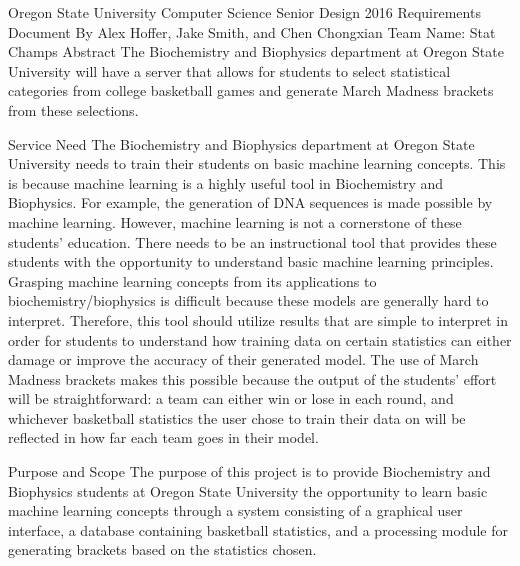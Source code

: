 \documentclass[letterpaper, 10pt,titlepage]{article}
\begin{document}
\begin{center}

Oregon State University Computer Science Senior Design 2016
\bigbreak
Requirements Document
\bigbreak
By Alex Hoffer, Jake Smith, and Chen Chongxian
\bigbreak
Team Name: Stat Champs
\bigbreak
\vspace{3.0cm}
 Abstract
\bigbreak
The Biochemistry and Biophysics department at Oregon State University will have a server that allows for students to select statistical categories from college basketball games and generate March Madness brackets from these selections.
\newpage
\end{center}





\begin{section}{Service Need}
The Biochemistry and Biophysics department at Oregon State University needs to train their students on basic machine learning concepts. This is because machine learning is a highly useful tool in Biochemistry and Biophysics. For example, the generation of DNA sequences is made possible by machine learning. However, machine learning is not a cornerstone of these students’ education. There needs to be an instructional tool that provides these students with the opportunity to understand basic machine learning principles. Grasping machine learning concepts from its applications to biochemistry/biophysics is difficult because these models are generally hard to interpret. Therefore, this tool should utilize results that are simple to interpret in order for students to understand how training data on certain statistics can either damage or improve the accuracy of their generated model. The use of March Madness brackets makes this possible because the output of the students’ effort will be straightforward: a team can either win or lose in each round, and whichever basketball statistics the user chose to train their data on will be reflected in how far each team goes in their model.
\end{section}


\begin{section}{Purpose and Scope}
The purpose of this project is to provide Biochemistry and Biophysics students at Oregon State University the opportunity to learn basic machine learning concepts through a system consisting of a graphical user interface, a database containing basketball statistics, and a processing module for generating brackets based on the statistics chosen.


\end{section}
\end{document}
